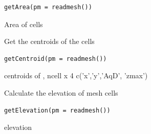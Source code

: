\documentclass[a4paper]{book}
\begin{document}
%
\begin{Usage}
\begin{verbatim}
getArea(pm = readmesh())
\end{verbatim}
\end{Usage}
%
\begin{Arguments}
\begin{ldescription}
\item[\code{pm}] 
\end{ldescription}
\end{Arguments}
%
\begin{Value}
Area of cells
\end{Value}
%
\begin{Description}\relax
Get the centroids of the cells
\end{Description}
%
\begin{Usage}
\begin{verbatim}
getCentroid(pm = readmesh())
\end{verbatim}
\end{Usage}
%
\begin{Arguments}
\begin{ldescription}
\item[\code{pm}] 
\end{ldescription}
\end{Arguments}
%
\begin{Value}
centroids of , ncell x 4 c('x','y','AqD', 'zmax')
\end{Value}
%
\begin{Description}\relax
Calculate the elevation of mesh cells
\end{Description}
%
\begin{Usage}
\begin{verbatim}
getElevation(pm = readmesh())
\end{verbatim}
\end{Usage}
%
\begin{Arguments}
\begin{ldescription}
\item[\code{pm}] 
\end{ldescription}
\end{Arguments}
%
\begin{Value}
elevation
\end{Value}
\end{document}
